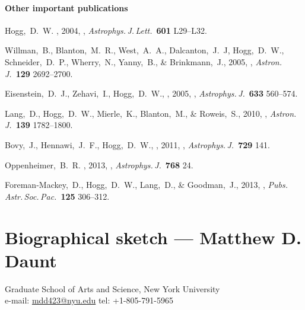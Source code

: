 \documentclass[12pt]{article}
\begin{document}
\paragraph{Other important publications}
\begin{list}{}{\hogglist}
\item
Hogg,~D.~W. \etal, 2004,
,
\textit{Astrophys.\,J.\,Lett.}\ \textbf{601} L29--L32.
\item
Willman,~B., Blanton,~M.~R., West,~A.~A., Dalcanton,~J.~J, Hogg,~D.~W., Schneider,~D.~P., Wherry,~N., Yanny,~B., \& Brinkmann,~J., 2005,
,
\textit{Astron.\,J.}\ \textbf{129} 2692--2700.
\item
Eisenstein,~D.~J., Zehavi,~I., Hogg,~D.~W., \etal, 2005,
,
\textit{Astrophys.\,J.}\ \textbf{633} 560--574.
\item
Lang,~D., Hogg,~D.~W., Mierle,~K., Blanton,~M., \& Roweis,~S., 2010,
,
\textit{Astron.\,J.}\ \textbf{139} 1782--1800.
\item
Bovy,~J., Hennawi,~J.~F., Hogg,~D.~W., \etal, 2011,
,
\textit{Astrophys.\,J.}\ \textbf{729} 141.
\item
Oppenheimer,~B.~R. \etal, 2013,
,
\textit{Astrophys.\,J.}\ \textbf{768} 24.
\item
Foreman-Mackey,~D., Hogg,~D.~W., Lang,~D., \& Goodman,~J., 2013,
,
\textit{Pubs.\,Astr.\,Soc.\,Pac.}\ \textbf{125} 306--312.
\label{rpcount}\end{list}

\setlength{\tabcolsep}{0.5em}
\clearpage
\section*{Biographical sketch --- Matthew D. Daunt}

Graduate School of Arts and Science, New York University \\
e-mail: \href{mailto:mdd423@nyu.edu}{mdd423@nyu.edu} \quad tel: +1-805-791-5965
\end{document}
